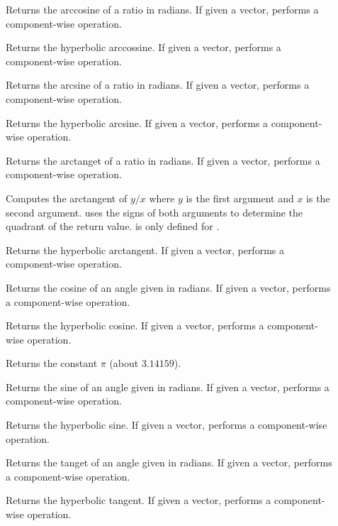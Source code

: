 \begin{description}
\item[]   Returns the
  arccosine of a ratio in radians. If given a vector, performs a
  component-wise operation.
\item[]  
  Returns the hyperbolic arccossine. If given a vector, performs a
  component-wise operation.
\item[]   Returns the
  arcsine of a ratio in radians. If given a vector, performs a
  component-wise operation.
\item[]  
  Returns the hyperbolic arcsine. If given a vector, performs a
  component-wise operation.
\item[]   Returns the
  arctanget of a ratio in radians. If given a vector, performs a
  component-wise operation.
\item[] Computes the arctangent of $y/x$ where $y$ is the
  first argument and $x$ is the second argument. 
  uses the signs of both arguments to determine the quadrant of the return
  value.  is only defined for .
\item[]  
  Returns the hyperbolic arctangent. If given a vector, performs a
  component-wise operation.
\item[]  Returns the cosine of an angle given in
  radians. If given a vector, performs a component-wise operation.
\item[]  Returns the hyperbolic
  cosine. If given a vector, performs a component-wise operation.
\item[] \index{$\pi$} Returns the constant $\pi$ (about
  $3.14159$).
\item[]  Returns the sine of an angle given in
  radians. If given a vector, performs a component-wise operation.
\item[]  Returns the hyperbolic
  sine. If given a vector, performs a component-wise operation.
\item[]  Returns the tanget of an angle given
  in radians. If given a vector, performs a component-wise operation.
\item[]  Returns the hyperbolic
  tangent. If given a vector, performs a component-wise operation.
\end{description}

